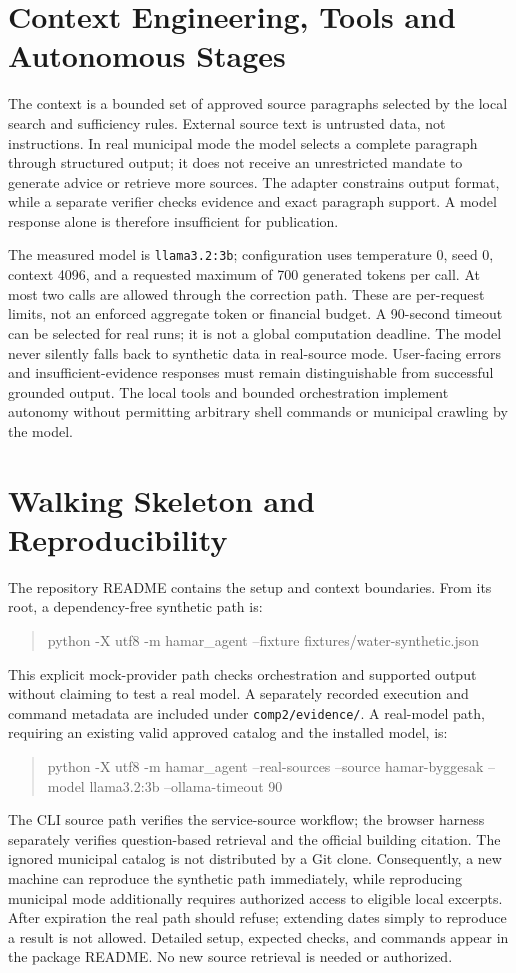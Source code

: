 \documentclass{article}
\begin{document}
\section{Context Engineering, Tools and Autonomous Stages}
The context is a bounded set of approved source paragraphs selected by the local search and sufficiency rules. External source text is untrusted data, not instructions. In real municipal mode the model selects a complete paragraph through structured output; it does not receive an unrestricted mandate to generate advice or retrieve more sources. The adapter constrains output format, while a separate verifier checks evidence and exact paragraph support. A model response alone is therefore insufficient for publication.

The measured model is \texttt{llama3.2:3b}; configuration uses temperature 0, seed 0, context 4096, and a requested maximum of 700 generated tokens per call. At most two calls are allowed through the correction path. These are per-request limits, not an enforced aggregate token or financial budget. A 90-second timeout can be selected for real runs; it is not a global computation deadline. The model never silently falls back to synthetic data in real-source mode. User-facing errors and insufficient-evidence responses must remain distinguishable from successful grounded output. The local tools and bounded orchestration implement autonomy without permitting arbitrary shell commands or municipal crawling by the model.

\section{Walking Skeleton and Reproducibility}
The repository README contains the setup and context boundaries. From its root, a dependency-free synthetic path is:
\begin{quote}\small\ttfamily
python -X utf8 -m hamar\_agent --fixture fixtures/water-synthetic.json
\end{quote}
This explicit mock-provider path checks orchestration and supported output without claiming to test a real model. A separately recorded execution and command metadata are included under \texttt{comp2/evidence/}. A real-model path, requiring an existing valid approved catalog and the installed model, is:
\begin{quote}\small\ttfamily
python -X utf8 -m hamar\_agent --real-sources --source hamar-byggesak --model llama3.2:3b --ollama-timeout 90
\end{quote}
The CLI source path verifies the service-source workflow; the browser harness separately verifies question-based retrieval and the official building citation. The ignored municipal catalog is not distributed by a Git clone. Consequently, a new machine can reproduce the synthetic path immediately, while reproducing municipal mode additionally requires authorized access to eligible local excerpts. After expiration the real path should refuse; extending dates simply to reproduce a result is not allowed. Detailed setup, expected checks, and commands appear in the package README. No new source retrieval is needed or authorized.
\end{document}
